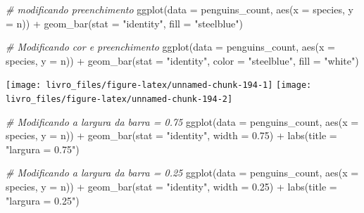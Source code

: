 \documentclass[
]{book}
\newenvironment{Shaded}{\begin{snugshade}}{\end{snugshade}}
\newcommand{\AttributeTok}[1]{\textcolor[rgb]{0.61,0.61,0.61}{#1}}
\newcommand{\CommentTok}[1]{\textcolor[rgb]{0.37,0.37,0.37}{\textit{#1}}}
\newcommand{\FloatTok}[1]{\textcolor[rgb]{0.06,0.06,0.06}{#1}}
\newcommand{\FunctionTok}[1]{\textcolor[rgb]{0,0,0}{#1}}
\newcommand{\NormalTok}[1]{#1}
\newcommand{\SpecialCharTok}[1]{\textcolor[rgb]{0,0,0}{#1}}
\newcommand{\StringTok}[1]{\textcolor[rgb]{0.5,0.5,0.5}{#1}}
\begin{document}
\begin{Shaded}
\begin{Highlighting}[]

\CommentTok{\# modificando preenchimento}
\FunctionTok{ggplot}\NormalTok{(}\AttributeTok{data =}\NormalTok{ penguins\_count, }
       \FunctionTok{aes}\NormalTok{(}\AttributeTok{x =}\NormalTok{ species, }\AttributeTok{y =}\NormalTok{ n)) }\SpecialCharTok{+} 
  \FunctionTok{geom\_bar}\NormalTok{(}\AttributeTok{stat =} \StringTok{"identity"}\NormalTok{, }
           \AttributeTok{fill =} \StringTok{"steelblue"}\NormalTok{)}

\CommentTok{\# Modificando cor e preenchimento}
\FunctionTok{ggplot}\NormalTok{(}\AttributeTok{data =}\NormalTok{ penguins\_count, }
       \FunctionTok{aes}\NormalTok{(}\AttributeTok{x =}\NormalTok{ species, }\AttributeTok{y =}\NormalTok{ n)) }\SpecialCharTok{+} 
  \FunctionTok{geom\_bar}\NormalTok{(}\AttributeTok{stat =} \StringTok{"identity"}\NormalTok{, }
           \AttributeTok{color =} \StringTok{"steelblue"}\NormalTok{, }
           \AttributeTok{fill =} \StringTok{"white"}\NormalTok{)}
\end{Highlighting}
\end{Shaded}

\begin{center}\texttt{[image: livro\_files/figure-latex/unnamed-chunk-194-1]} \texttt{[image: livro\_files/figure-latex/unnamed-chunk-194-2]} \end{center}

\begin{Shaded}
\begin{Highlighting}[]

\CommentTok{\# Modificando a largura da barra = 0.75}
\FunctionTok{ggplot}\NormalTok{(}\AttributeTok{data =}\NormalTok{ penguins\_count, }
       \FunctionTok{aes}\NormalTok{(}\AttributeTok{x =}\NormalTok{ species, }\AttributeTok{y =}\NormalTok{ n)) }\SpecialCharTok{+}
  \FunctionTok{geom\_bar}\NormalTok{(}\AttributeTok{stat =} \StringTok{"identity"}\NormalTok{, }
           \AttributeTok{width =} \FloatTok{0.75}\NormalTok{) }\SpecialCharTok{+}
  \FunctionTok{labs}\NormalTok{(}\AttributeTok{title =} \StringTok{"largura = 0.75"}\NormalTok{)}

\CommentTok{\# Modificando a largura da barra = 0.25}
\FunctionTok{ggplot}\NormalTok{(}\AttributeTok{data =}\NormalTok{ penguins\_count, }
       \FunctionTok{aes}\NormalTok{(}\AttributeTok{x =}\NormalTok{ species, }\AttributeTok{y =}\NormalTok{ n)) }\SpecialCharTok{+}
  \FunctionTok{geom\_bar}\NormalTok{(}\AttributeTok{stat =} \StringTok{"identity"}\NormalTok{, }
           \AttributeTok{width =} \FloatTok{0.25}\NormalTok{) }\SpecialCharTok{+}
  \FunctionTok{labs}\NormalTok{(}\AttributeTok{title =} \StringTok{"largura = 0.25"}\NormalTok{) }
\end{Highlighting}
\end{Shaded}
\end{document}
